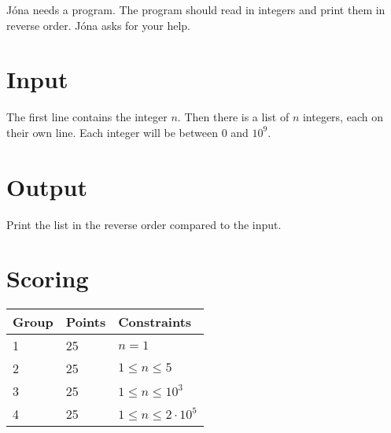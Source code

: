 
Jóna needs a program. The program should read in integers and print them in reverse order. Jóna asks for your help.

\section*{Input}
The first line contains the integer $n$. Then there is a list of $n$ integers, each on their own line.
Each integer will be between $0$ and $10^9$.

\section*{Output}
Print the list in the reverse order compared to the input.

\section*{Scoring}
\begin{tabular}{|l|l|l|}
\hline
Group & Points & Constraints  \\ \hline
1     & 25         & $n = 1$ \\ \hline
2     & 25         & $1 \leq n \leq 5 $ \\ \hline
3     & 25         & $1 \leq n \leq 10^{3} $ \\ \hline
4     & 25         & $1 \leq n \leq 2 \cdot 10^{5} $ \\ \hline
\end{tabular}
